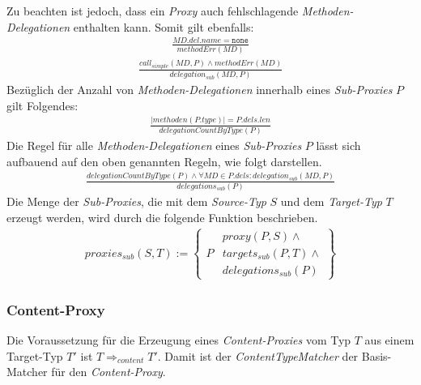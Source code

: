 \noindent
Zu beachten ist jedoch, dass ein \emph{Proxy} auch fehlschlagende \emph{Methoden-Delegationen} enthalten kann. Somit gilt ebenfalls:
\begin{gather*}
\frac{ \mathit{MD.del.name} = \texttt{none}}
{\mathit{methodErr(MD)}}
\end{gather*}
\begin{gather*}
\frac{\mathit{call_{simple}(MD, P)} \wedge \mathit{methodErr(MD)}}
{\mathit{delegation_{sub}(MD, P)}}
\end{gather*}
\noindent
Bezüglich der Anzahl von \emph{Methoden-Delegationen} innerhalb eines \emph{Sub-Proxies} $P$ gilt Folgendes:
\begin{gather*}
\frac{|\mathit{methoden(P.type)}| = P.dels.len}
{\mathit{delegationCountByType(P)}}
\end{gather*}
\noindent
Die Regel für alle \emph{Methoden-Delegationen} eines \emph{Sub-Proxies} $P$ lässt sich aufbauend auf den oben genannten Regeln, wie folgt darstellen.
\begin{gather*}
\frac{\mathit{delegationCountByType(P)} \wedge \forall \mathit{MD} \in P.dels: \mathit{delegation_{sub}(MD,P)}}
{\mathit{delegations_{sub}(P)}}
\end{gather*}
\noindent
Die Menge der \emph{Sub-Proxies}, die mit dem \emph{Source-Typ} $S$ und dem \emph{Target-Typ} $T$ erzeugt werden, wird durch die folgende Funktion beschrieben.
\begin{gather*}
\mathit{proxies_{sub}(S,T)} := 
\left\{\begin{array}{l|l}
		& \mathit{proxy(P,S)}\wedge \mathit{ } \\
	P	& \mathit{targets_{sub}(P,T)} \wedge \mathit{ } \\
		& \mathit{delegations_{sub}(P)}
		 \end{array}
\right\}
\end{gather*}
\subsubsection{Content-Proxy}
Die Voraussetzung für die Erzeugung eines \emph{Content-Proxies} vom Typ $T$ aus einem Target-Typ $T'$ ist $T \Rightarrow_{content} T'$. Damit ist der \emph{ContentTypeMatcher} der Basis-Matcher für den \emph{Content-Proxy}.
